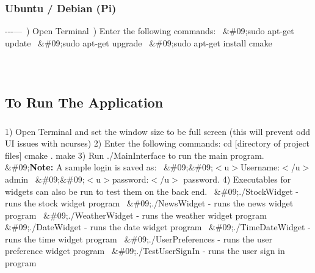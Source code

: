 \subsubsection*{Ubuntu / Debian (Pi)}

-\/-\/-\/---~) Open Terminal~) Enter the following commands\+:~\newline
 \&\#09;sudo apt-\/get update~\newline
 \&\#09;sudo apt-\/get upgrade~\newline
 \&\#09;sudo apt-\/get install cmake~\newline


\subparagraph*{}

~\newline
\subsection*{To Run The Application}

\subparagraph*{}

1) Open Terminal and set the window size to be full screen (this will prevent odd UI issues with ncurses) 2) Enter the following commands\+: cd \mbox{[}directory of project files\mbox{]} cmake . make 3) Run ./\+Main\+Interface to run the main program.~\newline
 \&\#09;{\bfseries Note\+:} A sample login is saved as\+:~\newline
 \&\#09;\&\#09;$<$u$>$Username\+:$<$/u$>$ admin~\newline
 \&\#09;\&\#09;$<$u$>$password\+:$<$/u$>$ password. 4) Executables for widgets can also be run to test them on the back end.~\newline
 \&\#09;./\+Stock\+Widget -\/ runs the stock widget program~\newline
 \&\#09;./\+News\+Widget -\/ runs the news widget program~\newline
 \&\#09;./\+Weather\+Widget -\/ runs the weather widget program~\newline
 \&\#09;./\+Date\+Widget -\/ runs the date widget program~\newline
 \&\#09;./\+Time\+Date\+Widget -\/ runs the time widget program~\newline
 \&\#09;./\+User\+Preferences -\/ runs the user preference widget program~\newline
 \&\#09;./\+Test\+User\+Sign\+In -\/ runs the user sign in program~\newline
 